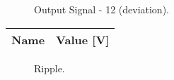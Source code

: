 \begin{figure}[H] \centering
\caption{Output Signal - 12 (deviation).}
\label{fig:v012}
\end{figure}

\begin{table}[H]
  \centering
  \begin{tabular}{|l|r|}
    \hline    
    {\bf Name} & {\bf Value [V]} \\ \hline
  \end{tabular}
  \label{tab:ripple}
\end{table}

\begin{figure}[H] \centering
\caption{Ripple.}
\label{fig:ripplegraph}
\end{figure}

